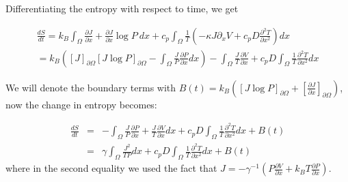 Differentiating the entropy with respect to time, we get

\begin{align}
\frac{d S}{d t} =  k_B \int_{\Omega} \frac{\partial J}{\partial x} + \frac{\partial J}{\partial x} \log P \ dx + c_p \int_{\Omega} \frac{1}{T} \left(-\kappa J \partial_x V + c_p D \frac{\partial^2 T}{\partial x^2} \right) dx \\
                     = k_B \left ( [J]_{\partial \Omega} [J \log P]_{\partial \Omega} - \int_{\Omega} \frac{J}{P} \frac{\partial P}{\partial x} dx \right) - \int_{\Omega} \frac{J}{T} \frac{\partial V}{\partial x} + c_p D \int_{\Omega} \frac{1}{T} \frac{\partial^2 T}{\partial x^2} dx
\end{align}

We will denote the boundary terms with $B(t) = k_B( [J \log P]_{\partial \Omega} + \left[\frac{\partial J}{\partial x} \right]_{\partial \Omega} ) $, now the change in entropy becomes:

\begin{eqnarray}
\frac{d S}{d t} & = & - \int_{\Omega} \frac{J}{P} \frac{\partial P}{\partial x} + \frac{J}{T} \frac{\partial V}{\partial x} dx +  c_p D \int_{\Omega} \frac{1}{T} \frac{\partial^2 T}{\partial x^2} dx + B(t) \\
                    & = & \gamma \int_{\Omega} \frac{J^2}{T P} dx + c_p D \int_{\Omega} \frac{1}{T} \frac{\partial^2 T}{\partial x^2} dx + B(t)
\end{eqnarray}
where in the second equality we used the fact that $J = -\gamma^{-1} ( P \frac{\partial V}{\partial x} + k_B T \frac{\partial P}{\partial x})$.

